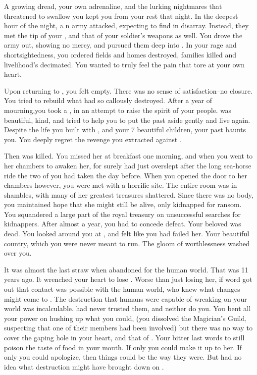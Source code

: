 \documentclass[char]{NeptuneBall}
\begin{document}
A growing dread, your own adrenaline, and the lurking nightmares that threatened to swallow you kept you from your rest that night. In the deepest hour of the night, a \pPacifica{}n army attacked, expecting to find \pAtlantis{} in disarray. Instead, they met the tip of your \iTrident{\MYname{}}, and that of your soldier's weapons as well. You drove the army out, showing no mercy, and pursued them deep into \pPacifica{}. In your rage and shortsightedness, you ordered fields and homes destroyed, families killed and livelihood's decimated. You wanted \pPacifica{} to truly feel the pain that tore at your own heart.

Upon returning to \pAtlantis{}, you felt empty. There was no sense of satisfaction--no closure. You tried to rebuild what \pPacifica{} had so callously destroyed. After a year of mourning,you took a \cQueen{\spouse{}}, \cQueen{\King{}} \cQueen{} in an attempt to raise the spirit of your people. \cQueen{\They{}} was beautiful, kind, and tried to help you to put the past aside gently and live again. Despite the life you built with \cQueen{}, and your 7 beautiful children, your past haunts you. You deeply regret the revenge you extracted against \pPacifica{}. 

Then \cQueen{} was killed. You missed her at breakfast one morning, and when you went to her chambers to awaken her, for surely \cQueen{\they} had just overslept after the long sea-horse ride the two of you had taken the day before. When you opened the door to her chambers however, you were met with a horrific site. The entire room was in shambles, with many of her greatest treasures shattered. Since there was no body, you maintained hope that she might still be alive, only kidnapped for ransom. You squandered a large part of the royal treasury on unsuccessful searches for \cQueen{\them{}} kidnappers. After almost a year, you had to concede defeat. Your beloved \cQueen{} was dead. You looked around you at \pAtlantis{}, and felt like you had failed her. Your beautiful country, which you were never meant to run. The gloom of worthlessness washed over you.

It was almost the last straw when \cAriel{\Prince} \cAriel{} abandoned \pAtlantis{} for the human world. That was 11 years ago.  It wrenched your heart to lose \cAriel{\them{}}. Worse than just losing her, if word got out that contact was possible with the human world, who knew what changes might come to \pAtlantis{}. The destruction that humans were capable of wreaking on your world was incalculable. \cExKing{\King} \cExKing{} had never trusted them, and neither do you. You bent all your power on hushing up what you could, (you dissolved the Magician's Guild, suspecting that one of their members had been involved) but there was no way to cover the gaping hole in your heart, and that of \pAtlantis{}. Your bitter last words to \cAriel{\Prince{}} \cAriel{\MYname{}} still poison the taste of food in your mouth. If only you could make it up to her. If only you could apologize, then things could be the way they were. But \cAriel{\they{}} had no idea what destruction \cAriel{\they{}} might have brought down on \pAtlantis{}.
\end{document}
